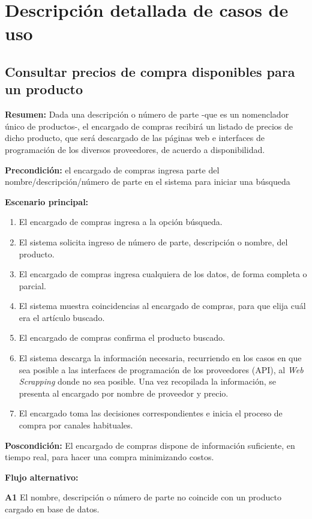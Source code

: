 \section{Descripción detallada de casos de uso}

\subsection{Consultar precios de compra disponibles para un producto}

\textbf{Resumen:}
Dada una descripción o número de parte
-que es un nomenclador único de productos-,
el encargado de compras recibirá un listado de precios de dicho producto,
que será descargado de las páginas web e interfaces de programación de los diversos proveedores,
de acuerdo a disponibilidad.

\textbf{Precondición:} 
el encargado de compras ingresa parte del nombre/descripción/número de parte en el sistema para iniciar una búsqueda

\textbf{Escenario principal:}
\begin{enumerate}
	\item El encargado de compras ingresa a la opción búsqueda.
	\item El sistema solicita ingreso de número de parte, descripción o nombre, del producto.
	\item El encargado de compras ingresa cualquiera de los datos, de forma completa o parcial.
	\item El sistema muestra coincidencias al encargado de compras, para que elija cuál era el artículo buscado.
	\item El encargado de compras confirma el producto buscado.
	\item El sistema descarga la información necesaria, 
	recurriendo en los casos en que sea posible a las interfaces de programación de los proveedores (API),
	al \textit{Web Scrapping} donde no sea posible. Una vez recopilada la información, 
	se presenta al encargado por nombre de proveedor y precio.
	\item El encargado toma las decisiones correspondientes e inicia el proceso de compra por canales habituales.
\end{enumerate}

\textbf{Poscondición:}
El encargado de compras dispone de información suficiente, en tiempo real, para hacer una compra minimizando costos.

\textbf{Flujo alternativo:}

\textbf{A1} El nombre, descripción o número de parte no coincide con un producto cargado en base de datos.

